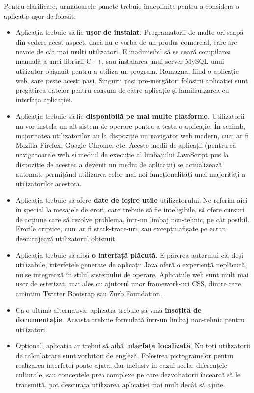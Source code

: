 \documentclass[12pt, a4paper, twoside, romanian]{teza-upb}
\begin{document}
      Pentru clarificare, următoarele puncte trebuie îndeplinite pentru a considera o aplicație ușor de folosit:
      \begin{itemize}
      \item Aplicația trebuie să fie \textbf{ușor de instalat}. Programatorii de multe ori scapă din vedere acest aspect, dacă nu e vorba de un produs comercial, care are nevoie de cât mai mulți utilizatori.
        E inadmisibil să se ceară compilarea manuală a unei librării C++, sau instalarea unui server MySQL unui utilizator obișnuit pentru a utiliza un program. Romagna, fiind o aplicație web, sare peste acești pași. Singurii pași pre-mergători folosirii aplicației sunt pregătirea datelor pentru consum de către aplicație și familiarizarea cu interfața aplicației.
      \item Aplicația trebuie să fie \textbf{disponibilă pe mai multe platforme}. Utilizatorii nu vor instala un alt sistem de operare pentru a testa o aplicație. 
        În schimb, majoritatea utilizatorilor au la dispoziție un navigator web modern, cum ar fi Mozilla Firefox, Google Chrome, etc. 
        Aceste medii de aplicații (pentru că navigatoarele web și mediul de execuție al limbajului JavaScript pus la dispoziție de acestea a devenit un mediu de aplicații) se actualizează automat, permițând utilizarea celor mai noi funcționalități unei majorități a utilizatorilor acestora.
        \item Aplicația trebuie să ofere \textbf{date de ieșire utile} utilizatorului. Ne referim aici în special la mesajele de erori, care trebuie să fie inteligibile, să ofere cursuri de acțiune care să rezolve problema, într-un limbaj non-tehnic, pe cât posibil.
          Erorile criptice, cum ar fi stack-trace-uri, sau excepții afișate pe ecran descurajează utilizatorul obișnuit.
        \item Aplicația trebuie să aibă \textbf{o interfață plăcută}. E părerea autorului că, deși utilizabile, interfețele generate de aplicații Java oferă o experiență neplăcută, nu se integrează în stilul sistemului de operare. Aplicațiile web sunt mult mai ușor de estetizat, mai ales cu ajutorul unor framework-uri CSS, dintre care amintim Twitter Bootsrap sau Zurb Foundation.
          \item Ca o ultimă alternativă, aplicația trebuie să vină \textbf{însoțită de documentație}. Aceasta trebuie formulată într-un limbaj non-tehnic pentru utilizatori. 
          \item Opțional, aplicația ar trebui să aibă \textbf{interfața localizată}. Nu toți utilizatorii de calculatoare sunt vorbitori de engleză. Folosirea pictogramelor pentru realizarea interfeței poate ajuta, dar inclusiv în cazul acela, diferențele culturale, sau conceptele prea complexe pe care dezvoltatorii încearcă să le transmită, pot descuraja utilizarea aplicației mai mult decât să ajute.
      \end{itemize}
\end{document}
